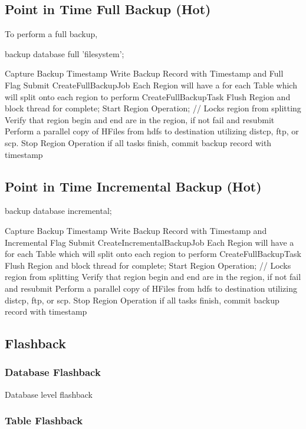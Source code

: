 \subsection{Point in Time Full Backup (Hot)}

To perform a full backup,

backup database full 'filesystem';

Capture Backup Timestamp
Write Backup Record with Timestamp and Full Flag
Submit CreateFullBackupJob 
Each Region will have a 
for each Table which will split onto each region to
perform CreateFullBackupTask 
	Flush Region and block thread for complete;
	Start Region Operation; // Locks region from splitting
	Verify that region begin and end are in the region, if not fail and resubmit
	Perform a parallel copy of HFiles from hdfs to destination utilizing distcp,
	ftp, or scp.
	Stop Region Operation
if all tasks finish, commit backup record with timestamp

\subsection{Point in Time Incremental Backup (Hot)}
	
backup database incremental;

Capture Backup Timestamp
Write Backup Record with Timestamp and Incremental Flag
Submit CreateIncrementalBackupJob 
Each Region will have a 
for each Table which will split onto each region to
perform CreateFullBackupTask 
	Flush Region and block thread for complete;
	Start Region Operation; // Locks region from splitting
	Verify that region begin and end are in the region, if not fail and resubmit
	Perform a parallel copy of HFiles from hdfs to destination utilizing distcp,
	ftp, or scp.
	Stop Region Operation
if all tasks finish, commit backup record with timestamp




\subsection{Flashback}


\subsubsection{Database Flashback}
Database level flashback



\subsubsection{Table Flashback}

